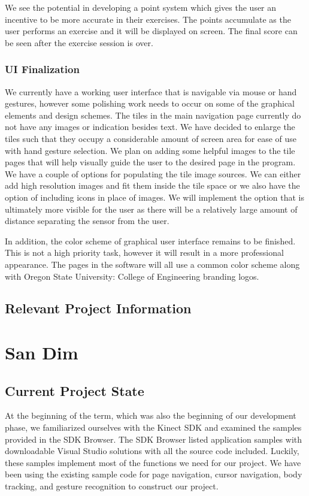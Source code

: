 \documentclass[onecolumn, draftclsnofoot,10pt, compsoc]{IEEEtran}
\begin{document}
We see the potential in developing a point system which gives the user an incentive to be more accurate in their exercises. The points accumulate as the user performs an exercise and it will be displayed on screen. The final score can be seen after the exercise session is over.


\subsubsection{UI Finalization}
We currently have a working user interface that is navigable via mouse or hand gestures, however some polishing work needs to occur on some of the graphical elements and design schemes. The tiles in the main navigation page currently do not have any images or indication besides text. We have decided to enlarge the tiles such that they occupy a considerable amount of screen area for ease of use with hand gesture selection. We plan on adding some helpful images to the tile pages that will help visually guide the user to the desired page in the program. We have a couple of options for populating the tile image sources. We can either add high resolution images and fit them inside the tile space or we also have the option of including icons in place of images. We will implement the option that is ultimately more visible for the user as there will be a relatively large amount of distance separating the sensor from the user. 

In addition, the color scheme of graphical user interface remains to be finished. This is not a high priority task, however it will result in a more professional appearance. The pages in the software will all use a common color scheme along with Oregon State University: College of Engineering branding logos. 

\subsection{Relevant Project Information}


\section{San Dim}
\subsection{Current Project State}
At the beginning of the term, which was also the beginning of our development phase, we familiarized ourselves with the Kinect SDK and examined the samples provided in the SDK Browser. The SDK Browser listed application samples with downloadable Visual Studio solutions with all the source code included. Luckily, these samples implement most of the functions we need for our project. We have been using the existing sample code for page navigation, cursor navigation, body tracking, and gesture recognition to construct our project.
\end{document}
